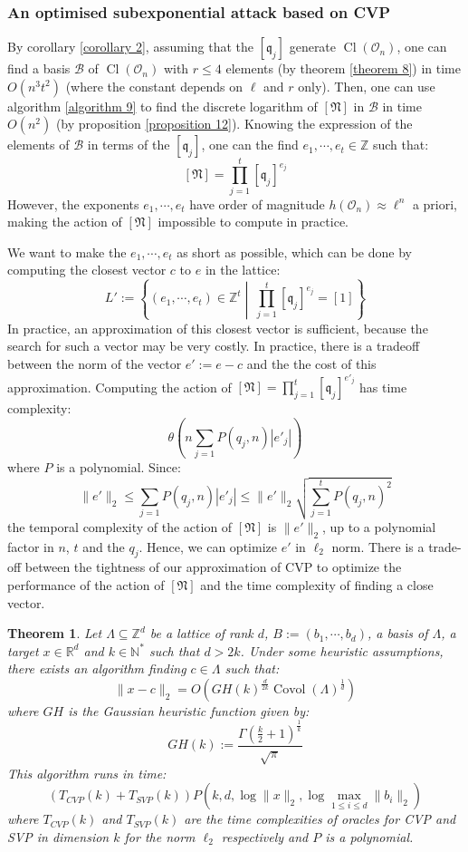 \documentclass[a4paper,10pt]{report}
\theoremstyle{definition}
\theoremstyle{plain}
\newtheorem{theorem}[definition]{Theorem}
\theoremstyle{definition}
\newcommand{\N}{\mathbb{N}}
\newcommand{\Z}{\mathbb{Z}}
\newcommand{\R}{\mathbb{R}}
\newcommand{\m}[1]{\mathcal{#1}}
\newcommand{\mO}{\mathcal{O}}
\renewcommand{\(}{\left(}
\renewcommand{\)}{\right)}
\newcommand{\mf}[1]{\mathfrak{#1}}
\DeclareMathOperator{\Cl}{Cl}
\DeclareMathOperator{\Covol}{Covol}
\begin{document}
\subsubsection{An optimised subexponential attack based on CVP}\label{paragraph 11}

By corollary \ref{corollary 2},  assuming that the $[\mf{q}_j]$ generate $\Cl(\mO_n)$, one can find a basis $\m{B}$ of $\Cl(\mO_n)$ with $r\leq 4$ elements (by theorem \ref{theorem 8}) in time $O(n^3t^2)$ (where the constant depends on $\ell$ and $r$ only).  Then, one can use algorithm \ref{algorithm 9} to find the discrete logarithm of $[\mf{N}]$ in $\m{B}$ in time $O(n^2)$ (by proposition \ref{proposition 12}).  Knowing the expression of the elements of $\m{B}$ in terms of the $[\mf{q}_j]$, one can the find $e_1, \cdots, e_t\in\Z$ such that:
\[[\mf{N}]=\prod_{j=1}^t[\mf{q}_j]^{e_j}\]
However, the exponents $e_1, \cdots, e_{t}$ have order of magnitude $h(\mO_n)\approx\ell^n$ a priori,  making the action of $[\mf{N}]$ impossible to compute in practice. 

We want to make the $e_1, \cdots, e_t$ as short as possible, which can be done by computing the closest vector $c$ to $e$ in the lattice:
\[L':=\left\{(e_1,\cdots,e_{t})\in\Z^{t} \middle| \  \prod_{j=1}^t[\mf{q}_j]^{e_j}=[1]\right\}\]
In practice, an approximation of this closest vector is sufficient, because the search for such a vector may be very costly. In practice, there is a tradeoff between the norm of the vector $e':=e-c$ and the the cost of this approximation. Computing the action of $[\mf{N}]=\prod_{j=1}^t[\mf{q}_j]^{e'_j}$ has time complexity:
\[\theta\(n\sum_{j=1}P(q_j,n)|e'_j|\)\]
where $P$ is a polynomial. Since:
\[\|e'\|_2\leq \sum_{j=1}P(q_j,n)|e'_j|\leq \|e'\|_2\sqrt{\sum_{j=1}^tP(q_j,n)^2}\]
the temporal complexity of the action of $[\mf{N}]$ is $\|e'\|_2$, up to a polynomial factor in $n$, $t$ and the $q_j$. Hence, we can optimize $e'$ in $\ell_2$ norm. There is a trade-off between the tightness of our approximation of CVP to optimize the performance of  the action of $[\mf{N}]$ and the time complexity of finding a close vector.

\begin{theorem}\cite[theorem 3.3]{Espitau2020}\label{theorem 7}
Let $\Lambda\subseteq\Z^d$ be a lattice of rank $d$, $B:=(b_1,\cdots, b_d)$,  a basis of $\Lambda$, a target $x\in\R^d$ and $k\in\N^*$ such that $d>2k$. Under some heuristic assumptions, there exists an algorithm finding $c\in\Lambda$ such that:
\[\|x-c\|_2=O\(GH(k)^{\frac{d}{2k}}\Covol(\Lambda)^{\frac{1}{d}}\)\]
where $GH$ is the Gaussian heuristic function given by:
\[GH(k):=\frac{\Gamma\(\frac{k}{2}+1\)^{\frac{1}{k}}}{\sqrt{\pi}}\]
This algorithm runs in time:
\[(T_{CVP}(k)+T_{SVP}(k))P\(k,d,\log\|x\|_2,\log\max_{1\leq i\leq d}\|b_i\|_2\)\]
where $T_{CVP}(k)$ and $T_{SVP}(k)$ are the time complexities of oracles  for CVP and SVP in dimension $k$ for the norm $\ell_2$ respectively and $P$ is a polynomial.
\end{theorem}
\end{document}
